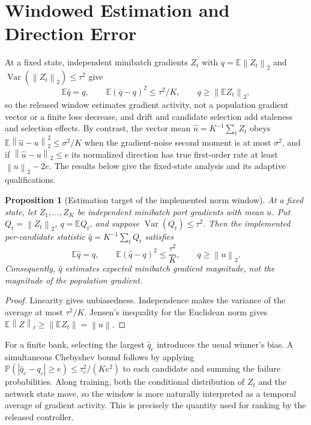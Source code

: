 \documentclass[10pt]{article}
\theoremstyle{paper}
\newtheorem{proposition}[theorem]{Proposition}
\newcommand{\E}{\mathbb E}
\newcommand{\Prob}{\mathbb P}
\newcommand{\norm}[1]{\left\lVert #1\right\rVert}
\begin{document}
\section{Windowed Estimation and Direction Error}
\label{app:estimation}
At a fixed state, independent minibatch gradients $Z_t$ with $q=\E\norm{Z_t}_2$ and $\operatorname{Var}(\norm{Z_t}_2)\le\tau^2$ give
\begin{equation}
\E\bar q=q,
\qquad \E(\bar q-q)^2\le\tau^2/K,
\qquad q\ge\norm{\E Z_t}_2,
\label{eq:main-norm-estimation}
\end{equation}
so the released window estimates gradient activity, not a population gradient vector or a finite loss decrease, and drift and candidate selection add staleness and selection effects. By contrast, the vector mean $\widehat u=K^{-1}\sum_tZ_t$ obeys $\E\norm{\widehat u-u}_2^2\le\sigma^2/K$ when the gradient-noise second moment is at most $\sigma^2$, and if $\norm{\widehat u-u}_2\le e$ its normalized direction has true first-order rate at least $\norm u_2-2e$. The results below give the fixed-state analysis and its adaptive qualifications.

\begin{proposition}[Estimation target of the implemented norm window]
\label{prop:normwindow}
At a fixed state, let $Z_1,\ldots,Z_K$ be independent minibatch port gradients with mean $u$. Put $Q_t=\norm{Z_t}_2$, $q=\E Q_t$, and suppose $\operatorname{Var}(Q_t)\le\tau^2$. Then the implemented per-candidate statistic $\widehat q=K^{-1}\sum_tQ_t$ satisfies
\[
\E\widehat q=q,
\qquad
\E(\widehat q-q)^2\le\frac{\tau^2}{K},
\qquad
q\ge\norm u_2.
\]
Consequently, $\widehat q$ estimates expected minibatch gradient magnitude, not the magnitude of the population gradient.
\end{proposition}
\begin{proof}
Linearity gives unbiasedness. Independence makes the variance of the average at most $\tau^2/K$. Jensen's inequality for the Euclidean norm gives $\E\norm Z_t\ge\norm{\E Z_t}=\norm u$.
\end{proof}

For a finite bank, selecting the largest $\widehat q_c$ introduces the usual winner's bias. A simultaneous Chebyshev bound follows by applying $\Prob(|\widehat q_c-q_c|\ge e)\le\tau_c^2/(Ke^2)$ to each candidate and summing the failure probabilities. Along training, both the conditional distribution of $Z_t$ and the network state move, so the window is more naturally interpreted as a temporal average of gradient activity. This is precisely the quantity used for ranking by the released controller.
\end{document}
